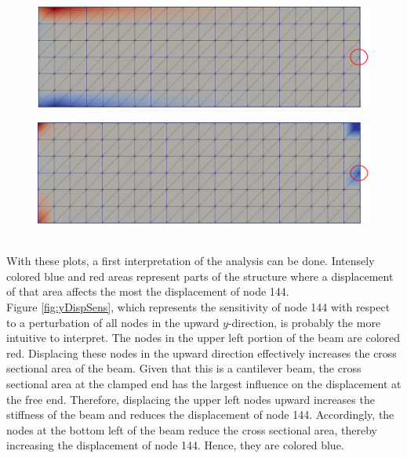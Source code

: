 \begin{figure}[ht]
\centering
\begin{minipage}{.5\textwidth}
  \centering
  \includegraphics[width=1.0\linewidth]{images/sensitivityanalysisY.png}
  \label{fig:yDispSens}
\end{minipage}%
\begin{minipage}{.5\textwidth}
  \centering
  \includegraphics[width=1.0\linewidth]{images/sensitivityanalysisX.png}
  \label{fig:xDispSens}
\end{minipage}
\end{figure}\\
With these plots, a first interpretation of the analysis can be done. Intensely colored blue and red areas represent parts of the structure where a displacement of that area affects the most the displacement of node 144. \\[6pt]
Figure \ref{fig:yDispSens}, which represents the sensitivity of node 144 with respect to a perturbation of all nodes in the upward $y$-direction, is probably the more intuitive to interpret. The nodes in the upper left portion of the beam are colored red. Displacing these nodes in the upward direction effectively increases the cross sectional area of the beam. Given that this is a cantilever beam, the cross sectional area at the clamped end has the largest influence on the displacement at the free end. Therefore, displacing the upper left nodes upward increases the stiffness of the beam and reduces the displacement of node 144. Accordingly, the nodes at the bottom left of the beam reduce the cross sectional area, thereby increasing the displacement of node 144. Hence, they are colored blue.\\[6pt]
